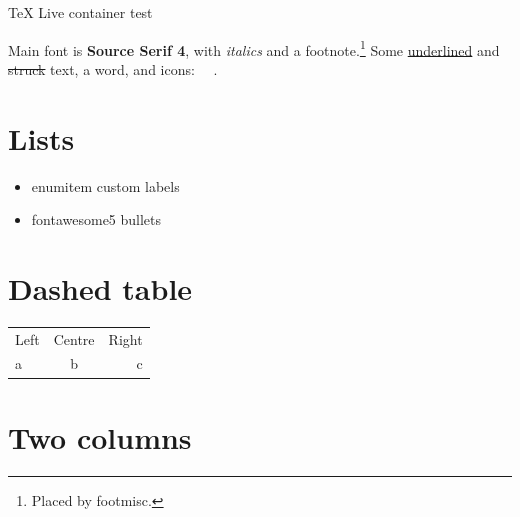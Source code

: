 \documentclass[11pt]{article}
\begin{document}
{\cormorant\Huge\color{accent} TeX Live container test}

\vspace{0.5em}
Main font is \textbf{Source Serif 4}, with \textit{italics} and a footnote.\footnote{Placed by footmisc.}
Some \uline{underlined} and \sout{struck} text, a  word,
and icons: \faGithub\ \faFilePdf\ \faCheckCircle.

\section*{Lists}
\begin{itemize}[label=\faAngleRight, leftmargin=*]
  \item enumitem custom labels
  \item fontawesome5 bullets
\end{itemize}

\section*{Dashed table}
\begin{tabular}{l:c:r}
  Left & Centre & Right \\ \hdashline
  a & b & c \\
\end{tabular}

\section*{Two columns}
\begin{paracol}{2}
  \justifying\lipsum[1][1-4]
  \switchcolumn
  \RaggedRight\lipsum[2][1-4]
\end{paracol}
\end{document}
